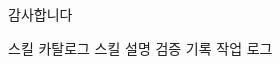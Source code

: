 \documentclass[aspectratio=169,10pt]{beamer}
\begin{document}
\begin{frame}{}
  \centering
  \Huge 감사합니다

  \vspace{1em}
  \normalsize
  스킬 카탈로그 \;\textbar\; 스킬 설명 \;\textbar\; 검증 기록 \;\textbar\; 작업 로그
\end{frame}
\end{document}
